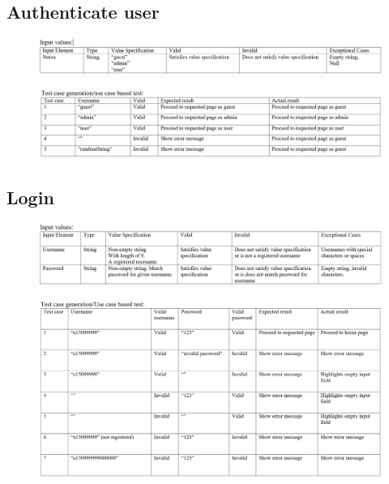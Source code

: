 \documentclass[english]{article}
\begin{document}
\subsection{Authenticate user}
\begin{figure}[ht!]
\hspace*{-2.5cm} 
\includegraphics[width=180mm]{1.png}
\end{figure}
\begin{figure}[ht!]
\hspace*{-2.5cm} 
\includegraphics[width=180mm]{2.png}
\end{figure}
\subsection{Login}
\begin{figure}[H]
\hspace*{-2.5cm} 
\includegraphics[width=180mm]{3.png}
\end{figure}
\begin{figure}[H]
\hspace*{-2.5cm} 
\includegraphics[width=180mm]{4.png}
\end{figure}
\end{document}
